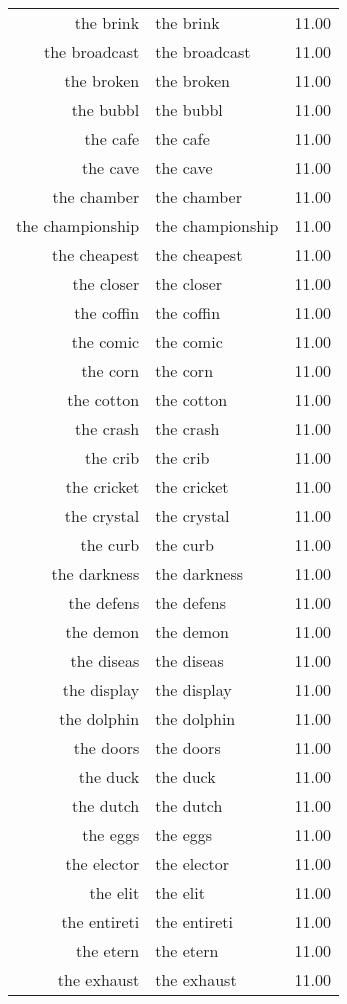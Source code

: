 \begin{table}[ht]
\begin{tabular}{rlr}
  the brink & the brink & 11.00 \\ 
  the broadcast & the broadcast & 11.00 \\ 
  the broken & the broken & 11.00 \\ 
  the bubbl & the bubbl & 11.00 \\ 
  the cafe & the cafe & 11.00 \\ 
  the cave & the cave & 11.00 \\ 
  the chamber & the chamber & 11.00 \\ 
  the championship & the championship & 11.00 \\ 
  the cheapest & the cheapest & 11.00 \\ 
  the closer & the closer & 11.00 \\ 
  the coffin & the coffin & 11.00 \\ 
  the comic & the comic & 11.00 \\ 
  the corn & the corn & 11.00 \\ 
  the cotton & the cotton & 11.00 \\ 
  the crash & the crash & 11.00 \\ 
  the crib & the crib & 11.00 \\ 
  the cricket & the cricket & 11.00 \\ 
  the crystal & the crystal & 11.00 \\ 
  the curb & the curb & 11.00 \\ 
  the darkness & the darkness & 11.00 \\ 
  the defens & the defens & 11.00 \\ 
  the demon & the demon & 11.00 \\ 
  the diseas & the diseas & 11.00 \\ 
  the display & the display & 11.00 \\ 
  the dolphin & the dolphin & 11.00 \\ 
  the doors & the doors & 11.00 \\ 
  the duck & the duck & 11.00 \\ 
  the dutch & the dutch & 11.00 \\ 
  the eggs & the eggs & 11.00 \\ 
  the elector & the elector & 11.00 \\ 
  the elit & the elit & 11.00 \\ 
  the entireti & the entireti & 11.00 \\ 
  the etern & the etern & 11.00 \\ 
  the exhaust & the exhaust & 11.00 \\ 

\end{tabular}
\end{table}
